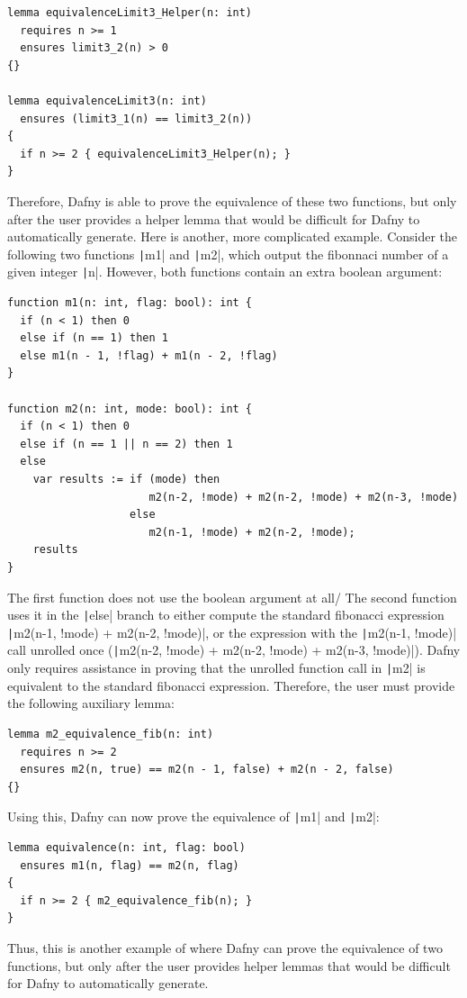 \begin{verbatim}
lemma equivalenceLimit3_Helper(n: int)
  requires n >= 1
  ensures limit3_2(n) > 0
{}

lemma equivalenceLimit3(n: int)
  ensures (limit3_1(n) == limit3_2(n))
{
  if n >= 2 { equivalenceLimit3_Helper(n); }
}
\end{verbatim}
%
Therefore, Dafny is able to prove the equivalence of these two functions, but only after the user provides a helper lemma that would be difficult for Dafny to automatically generate. Here is another, more complicated example. Consider the following two functions \texttt|m1| and \texttt|m2|, which output the fibonnaci number of a given integer \texttt|n|. However, both functions contain an extra boolean argument: 
\begin{verbatim}
function m1(n: int, flag: bool): int {
  if (n < 1) then 0
  else if (n == 1) then 1
  else m1(n - 1, !flag) + m1(n - 2, !flag)
}

function m2(n: int, mode: bool): int {
  if (n < 1) then 0
  else if (n == 1 || n == 2) then 1
  else
    var results := if (mode) then
                      m2(n-2, !mode) + m2(n-2, !mode) + m2(n-3, !mode) 
                   else
                      m2(n-1, !mode) + m2(n-2, !mode);
    results
}
\end{verbatim}
%
The first function does not use the boolean argument at all/ The second function uses it in the \texttt|else| branch to either compute the standard fibonacci expression \texttt|m2(n-1, !mode) + m2(n-2, !mode)|, or the expression with the \texttt|m2(n-1, !mode)| call unrolled once (\texttt|m2(n-2, !mode) + m2(n-2, !mode) + m2(n-3, !mode)|). Dafny only requires assistance in proving that the unrolled function call in \texttt|m2| is equivalent to the standard fibonacci expression. Therefore, the user must provide the following auxiliary lemma:

\begin{verbatim}
lemma m2_equivalence_fib(n: int)
  requires n >= 2
  ensures m2(n, true) == m2(n - 1, false) + m2(n - 2, false)
{}
\end{verbatim}
%
Using this, Dafny can now prove the equivalence of \texttt|m1| and \texttt|m2|:
\begin{verbatim}
lemma equivalence(n: int, flag: bool)
  ensures m1(n, flag) == m2(n, flag)
{
  if n >= 2 { m2_equivalence_fib(n); }
}
\end{verbatim}
%
Thus, this is another example of where Dafny can prove the equivalence of two functions, but only after the user provides helper lemmas that would be difficult for Dafny to automatically generate.

